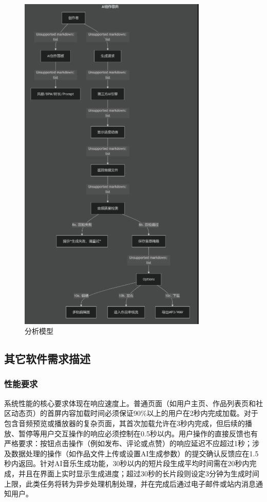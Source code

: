 \documentclass{base}
\begin{document}
\begin{figure}[H]
    \centering
    \includegraphics[width=0.8\textwidth]{images/4-3.png}
    \caption{分析模型}
\end{figure}

\subsection{其它软件需求描述}
\subsubsection{性能要求}

系统性能的核心要求体现在响应速度上。普通页面（如用户主页、作品列表页和社区动态页）的首屏内容加载时间必须保证90\%以上的用户在2秒内完成加载。对于包含音频预览或播放器的复杂页面，其首次加载允许在3秒内完成，但后续的播放、暂停等用户交互操作的响应必须控制在0.5秒以内。用户操作的直接反馈也有严格要求：按钮点击操作（例如发布、评论或点赞）的响应延迟不应超过1秒；涉及数据处理的操作（如作品文件上传或设置AI生成参数）的提交确认反馈应在1.5秒内返回。针对AI音乐生成功能，30秒以内的短片段生成平均时间需在20秒内完成，并且在界面上实时显示生成进度；超过30秒的长片段则设定3分钟为生成时间上限，此类任务将转为异步处理机制处理，并在完成后通过电子邮件或站内消息通知用户。
\end{document}
